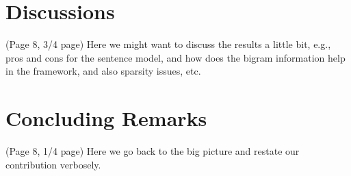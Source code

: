 \section{Discussions} { \color{red} (Page 8, 3/4 page)  Here we might want to discuss the
results a little bit, e.g., pros and cons for the sentence model, and how does
the bigram information help in the framework, and also sparsity issues, etc. }

\section{Concluding Remarks} { \color{red} (Page 8, 1/4 page)
Here we go back to the big picture and restate our contribution verbosely.  }

% 
% 
%     
% 
